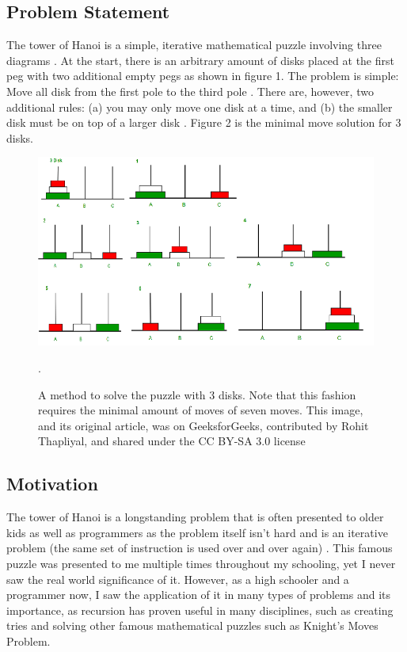 \documentclass[12pt,a4paper]{article}
\begin{document}
	\subsection{Problem Statement}
	The tower of Hanoi is a simple, iterative mathematical puzzle involving three diagrams \cite{Buddies}. At the start, there is an arbitrary amount of disks placed at the first peg with two additional empty pegs as shown in figure 1.  \newpage
	\noindent The problem is simple: Move all disk from the first pole to the third pole \cite{Buddies}. There are, however, two additional rules: (a) you may only move one disk at a time, and (b) the smaller disk must be on top of a larger disk \cite{Buddies}. Figure 2 is the minimal move solution for 3 disks.\newline
	\begin{figure}
		\begin{center}
			\includegraphics{3-disk.png}
			\caption{A method to solve the puzzle with 3 disks. Note that this fashion requires the minimal amount of moves of seven moves. This image, and its original article, was on GeeksforGeeks, contributed by Rohit Thapliyal, and shared under the CC BY-SA 3.0 license}. 
		\end{center}
	\end{figure}
	\subsection{Motivation}
	The tower of Hanoi is a longstanding problem that is often presented to older kids as well as programmers as the problem itself isn't hard and is an iterative problem (the same set of instruction is used over and over again) \cite{Buddies}. This famous puzzle was presented to me multiple times throughout my schooling, yet I never saw the real world significance of it. However, as a high schooler and a programmer now, I saw the application of it in many types of problems and its importance, as recursion has proven useful in many disciplines, such as creating tries and solving other famous mathematical puzzles such as Knight's Moves Problem. 
	
\end{document}

